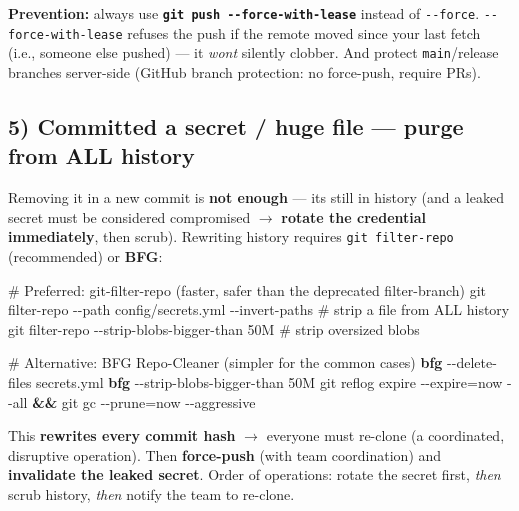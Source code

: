 \documentclass[11pt]{article}
\newenvironment{Shaded}{\begin{snugshade}}{\end{snugshade}}
\newcommand{\AttributeTok}[1]{\textcolor[rgb]{0.16,0.50,0.73}{#1}}
\newcommand{\CommentTok}[1]{\textcolor[rgb]{0.48,0.49,0.49}{#1}}
\newcommand{\ExtensionTok}[1]{\textcolor[rgb]{0.00,0.60,1.00}{\textbf{#1}}}
\newcommand{\FunctionTok}[1]{\textcolor[rgb]{0.56,0.27,0.68}{#1}}
\newcommand{\KeywordTok}[1]{\textcolor[rgb]{0.81,0.81,0.76}{\textbf{#1}}}
\newcommand{\NormalTok}[1]{\textcolor[rgb]{0.81,0.81,0.76}{#1}}
\newcommand{\OperatorTok}[1]{\textcolor[rgb]{0.81,0.81,0.76}{#1}}
\begin{document}
\textbf{Prevention:} always use \textbf{\texttt{git\ push\ -\/-force-with-lease}} instead of \texttt{-\/-force}. \texttt{-\/-force-with-lease} refuses the push if the remote moved since your last fetch (i.e., someone else pushed) --- it \emph{won\textquotesingle t} silently clobber. And protect \texttt{main}/release branches server-side (GitHub branch protection: no force-push, require PRs).

\subsection{5) Committed a secret / huge file --- purge from ALL history}\label{5-committed-a-secret--huge-file--purge-from-all-history}

Removing it in a new commit is \textbf{not enough} --- it\textquotesingle s still in history (and a leaked secret must be considered compromised \(\rightarrow\) \textbf{rotate the credential immediately}, then scrub). Rewriting history requires \texttt{git\ filter-repo} (recommended) or \textbf{BFG}:


\begin{Shaded}
\begin{Highlighting}[]
\CommentTok{\# Preferred: git{-}filter{-}repo (faster, safer than the deprecated filter{-}branch)}
\FunctionTok{git}\NormalTok{ filter{-}repo }\AttributeTok{{-}{-}path}\NormalTok{ config/secrets.yml }\AttributeTok{{-}{-}invert{-}paths}   \CommentTok{\# strip a file from ALL history}
\FunctionTok{git}\NormalTok{ filter{-}repo }\AttributeTok{{-}{-}strip{-}blobs{-}bigger{-}than}\NormalTok{ 50M              }\CommentTok{\# strip oversized blobs}

\CommentTok{\# Alternative: BFG Repo{-}Cleaner (simpler for the common cases)}
\ExtensionTok{bfg} \AttributeTok{{-}{-}delete{-}files}\NormalTok{ secrets.yml}
\ExtensionTok{bfg} \AttributeTok{{-}{-}strip{-}blobs{-}bigger{-}than}\NormalTok{ 50M}
\FunctionTok{git}\NormalTok{ reflog expire }\AttributeTok{{-}{-}expire}\OperatorTok{=}\NormalTok{now }\AttributeTok{{-}{-}all} \KeywordTok{\&\&} \FunctionTok{git}\NormalTok{ gc }\AttributeTok{{-}{-}prune}\OperatorTok{=}\NormalTok{now }\AttributeTok{{-}{-}aggressive}
\end{Highlighting}
\end{Shaded}

This \textbf{rewrites every commit hash} \(\rightarrow\) everyone must re-clone (a coordinated, disruptive operation). Then \textbf{force-push} (with team coordination) and \textbf{invalidate the leaked secret}. Order of operations: rotate the secret first, \emph{then} scrub history, \emph{then} notify the team to re-clone.
\end{document}
